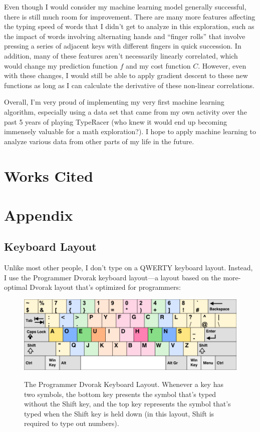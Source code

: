 \documentclass[12pt]{article}
\begin{document}
Even though I would consider my machine learning model generally successful, there is still much room for improvement. There are many more features affecting the typing speed of words that I didn't get to analyze in this exploration, such as the impact of words involving alternating hands and ``finger rolls'' that involve pressing a series of adjacent keys with different fingers in quick succession. In addition, many of these features aren't necessarily linearly correlated, which would change my prediction function $f$ and my cost function $C$. However, even with these changes, I would still be able to apply gradient descent to these new functions as long as I can calculate the derivative of these non-linear correlations.

Overall, I'm very proud of implementing my very first machine learning algorithm, especially using a data set that came from my own activity over the past 5 years of playing TypeRacer (who knew it would end up becoming immensely valuable for a math exploration?). I hope to apply machine learning to analyze various data from other parts of my life in the future.

\newpage

\section*{Works Cited}

\nocite{*}
\setlength{}
\printbibliography

\newpage

\section*{Appendix}

\subsection*{Keyboard Layout}

Unlike most other people, I don't type on a QWERTY keyboard layout. Instead, I use the Programmer Dvorak keyboard layout—a layout based on the more-optimal Dvorak layout that's optimized for programmers:
\begin{figure}[H]
	\caption{The Programmer Dvorak Keyboard Layout. Whenever a key has two symbols, the bottom key presents the symbol that's typed without the Shift key, and the top key represents the symbol that's typed when the Shift key is held down (in this layout, Shift is required to type out numbers).}
	\includegraphics[width=\textwidth]{programmer-dvorak.png}
	\label{fig:programmer-dvorak}
\end{figure}
\end{document}
